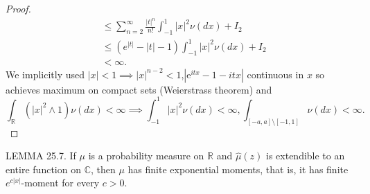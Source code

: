 \documentclass[a4paper,11pt]{article}
\begin{document}
\begin{proof}
{\begin{align*}
         & \leq  \sum_{n=2}^{\infty} \frac{|t|^{n}}{n!} \int_{-1}^{1}|x|^{2} \nu(dx) + I_{2}                                                                                       \\
         & \leq  (e^{|t| }-|t| -1)  \int_{-1}^{1}|x|^{2} \nu(dx) + I_{2}                                                                                                           \\
         & < \infty
        .
    \end{align*}
    We implicitly used $|x|<1 \implies |x|^{n-2}<1$,$|\mathrm{e}^{i tx}-1-itx|$ continuous in $x$ so achieves maximum on compact sets (Weierstrass theorem) and
    $$
        \int_{\mathbb{R}} (|x|^{2} \wedge 1) \nu(dx)<\infty \implies \int_{-1}^{1} |x|^{2} \nu(dx)<\infty, \int_{[-a,a] \setminus [-1,1]} \nu(dx)<\infty   .
    $$
    }
\end{proof}


LEMMA 25.7. If $\mu$ is a probability measure on $\mathbb{R}$ and $\widehat{\mu}(z)$ is extendible to an entire
function on $\mathbb{C}$, then $\mu$ has finite exponential moments, that is, it has finite $e^{c|x|}$-moment for every $c>0$.
\end{document}

